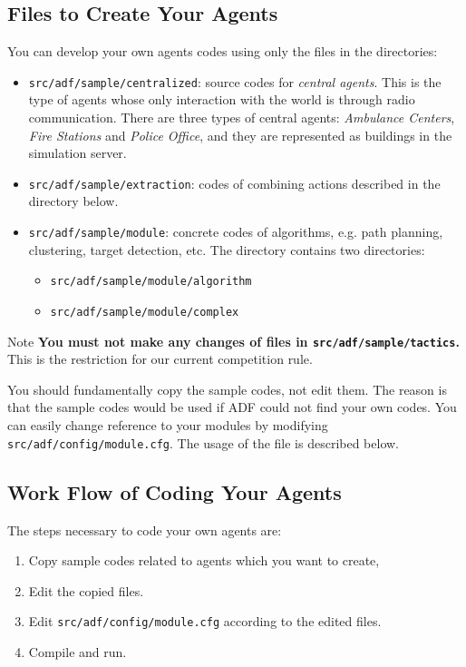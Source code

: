 \documentclass{article}
\begin{document}
\subsection{Files to Create Your Agents}
You can develop your own agents codes using only the files in the directories:
\begin{itemize}
 \item \texttt{src/adf/sample/centralized}: source codes for {\itshape central agents}. This is the type of agents whose only interaction with the world is through radio communication. There are three types of central agents: \textit{Ambulance Centers}, \textit{Fire Stations} and \textit{Police Office}, and they are represented as buildings in the simulation server.
 \item \texttt{src/adf/sample/extraction}: codes of combining actions described in the directory below.
 \item \texttt{src/adf/sample/module}: concrete codes of algorithms, e.g. path planning, clustering, target detection, etc. The directory contains two directories:
 \begin{itemize}
    \item \texttt{src/adf/sample/module/algorithm}
    \item \texttt{src/adf/sample/module/complex}
 \end{itemize}
\end{itemize}

\begin{itembox}[l]{Note}
{\bfseries You must not make any changes of files in \texttt{src/adf/sample/tactics}.} This is the restriction for our current competition rule.
\end{itembox}

You should fundamentally copy the sample codes, not edit them. The reason is that the sample codes would be used if ADF could not find your own codes. You can easily change reference to your modules by modifying \texttt{src/adf/config/module.cfg}. The usage of the file is described below.
\subsection{Work Flow of Coding Your Agents}
The steps necessary to code your own agents are:
\begin{enumerate}
 \item Copy sample codes related to agents which you want to create,
 \item Edit the copied files.
 \item Edit \texttt{src/adf/config/module.cfg} according to the edited files.
 \item Compile and run.
\end{enumerate}
\end{document}

